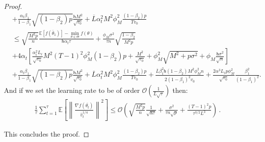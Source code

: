 \documentclass[11pt]{article}
\def\EE{\mathbb{E}}
\def\tot{\mathsf{h}}
\begin{document}
\begin{proof}
\begin{align*}
   &  +\frac{\alpha_t \beta_1}{1-\beta_1}  \sqrt{(1-\beta_2)p} \frac{\tot M^2}{\sqrt{v_0}} +\overline{L} \alpha_t^2 M^2 \phi_M^2 \frac{(1-\beta_2)p}{Tv_0} \nonumber\\
   & \leq   \sqrt{\frac{M^2 p}{n}}  \frac{ \EE[f(\bar{\theta}_1)]  - \min \limits_{\theta \in \Theta} f(\theta)}{\tot \alpha_t \tau} +      \frac{\phi_M   \sigma^2}{\tau n} \sqrt{\frac{1 - \beta_2}{M^2 p}  } \nonumber\\
    &   +4\alpha_t \left[ \frac{\alpha_t^2 L_\ell}{\sqrt{v_0}}  M^2 (T-1)^2 \phi_M^2 (1-\beta_2)p + \frac{M^2}{\sqrt{v_0}}+\phi_M^2\sqrt{M^2+p\sigma^2} + \phi_M \frac{\tot \sigma^2}{\sqrt{n}}\right]   \nonumber\\
   &  +\frac{\alpha_t \beta_1}{1-\beta_1}  \sqrt{(1-\beta_2)p} \frac{\tot M^2}{\sqrt{v_0}} +\overline{L} \alpha_t^2 M^2 \phi_M^2 \frac{(1-\beta_2)p}{Tv_0}  + \frac{ \overline{L}\beta_1^2\tot(1-\beta_2)M^2 \phi^2_M n}{2(1-\beta_1)^2 v_0}  +\frac{2\alpha^3 L_\ell p\phi_M^2}{ \sqrt{v_0}}\frac{\beta_1^2}{(1-\beta_1)^2}.
\end{align*}
 And if we set the learning rate to be of order $\mathcal{O}(\frac{1}{L \sqrt{\tau}})$ then:
 \begin{align*}
     \frac{1}{\tau}\sum_{t=1}^\tau  \EE\left[ \left\| \frac{\nabla f(\overline{\theta_t})}{\hat v_t^{1/4}}   \right \|^2 \right] \leq \mathcal{O}\left( \sqrt{\frac{M^2 p}{n}} \frac{1}{\sqrt{\tot \tau}} + \frac{\sigma^2 }{\tau n\sqrt{p}}+\frac{(T-1)^2p}{\tau^{3/2}L^3}\right) \, .
 \end{align*}
 
This concludes the proof.

\end{proof}








\end{document}
